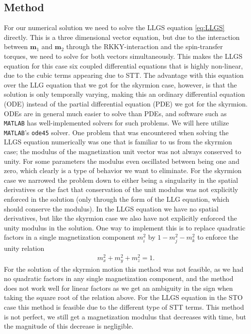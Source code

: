 \subsection{Method}
For our numerical solution we need to solve the LLGS equation \eqref{eq:LLGS} directly. This is a three dimensional vector equation, but due to the interaction between $\mathbold{m}_1$ and $\mathbold{m}_2$ through the RKKY-interaction and the spin-transfer torques, we need to solve for both vectors simultaneously. This makes the LLGS equation for this case six coupled differential equations that is highly non-linear, due to the cubic terms appearing due to STT. The advantage with this equation over the LLG equation that we got for the skyrmion case, however, is that the solution is only temporally varying, making this an ordinary differential equation (ODE) instead of the partial differential equation (PDE) we got for the skyrmion. ODEs are in general much easier to solve than PDEs, and software such as \texttt{MATLAB} has well-implemented solvers for such problems. We will here utilize \texttt{MATLAB}'s \texttt{ode45} solver. One problem that was encountered when solving the LLGS equation numerically was one that is familiar to us from the skyrmion case; the modulus of the magnetization unit vector was not always conserved to unity. For some parameters the modulus even oscillated between being one and zero, which clearly is a type of behavior we want to eliminate. For the skyrmion case we narrowed the problem down to either being a singularity in the spatial derivatives or the fact that conservation of the unit modulus was not explicitly enforced in the solution (only through the form of the LLG equation, which should conserve the modulus). In the LLGS equation we have no spatial derivatives, but like the skyrmion case we also have not explicitly enforced the unity modulus in the solution. One way to implement this is to replace quadratic factors in a single magnetization component $m_i^2$ by $1-m_j^2-m_k^2$ to enforce the unity relation
\begin{align}
    m_x^2+m_y^2+m_z^2=1.
\end{align}
For the solution of the skyrmion motion this method was not feasible, as we had no quadratic factors in any single magnetization component, and the method does not work well for linear factors as we get an ambiguity in the sign when taking the square root of the relation above. For the LLGS equation in the STO case this method is feasible due to the different type of STT terms. This method is not perfect, we still get a magnetization modulus that decreases with time, but the magnitude of this decrease is negligible.

